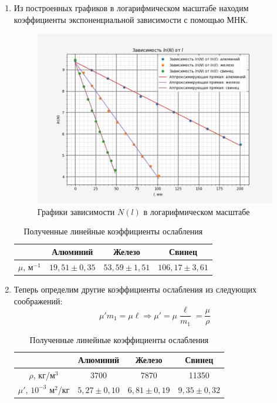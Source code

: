 \begin{enumerate}
    \item Из построенных графиков в логарифмическом масштабе находим коэффициенты экспоненциальной зависимости с помощью МНК.

    \begin{figure}[h!]
        \centering
        \includegraphics[width = 15 cm]{images/ln_N_l}
        \caption{Графики зависимости $N(l)$ в логарифмическом масштабе}
        \label{N(l)}
    \end{figure}
    
    \begin{table}[h!]
        \centering
        \begin{tabular}{|c|c|c|c|}
        \hline & Алюминий          & Железо            & Свинец                   \\ \hline
        $\mu$, м$^{-1}$ & $19,51 \pm 0,35$ & $53,59 \pm 1,51$ & $106,17 \pm 3,61$ \\ \hline
        \end{tabular}
        \caption{Полученные линейные коэффициенты ослабления}
    \end{table}

    \item Теперь определим другие коэффициенты ослабления из следующих соображений: 
    \[ \mu' m_1 = \mu \ell \Rightarrow \mu' = \mu \frac{\ell}{m_1} = \frac{\mu}{\rho}\]

    \begin{table}[h!]
    \centering
        \begin{tabular}{|c|c|c|c|}
        \hline & Алюминий        & Железо        & Свинец                                \\ \hline
        $\rho$,  кг/м$^3$        & 3700            & 7870          & 11350               \\ \hline
        $\mu'$, $10^{-3}$ м$^2$/кг & $5,27 \pm 0,10$ & $6,81 \pm 0,19$ & $9,35 \pm 0,32$ \\ \hline
        \end{tabular}
    \caption{Полученные линейные коэффициенты ослабления}
    \end{table}


\end{enumerate}
